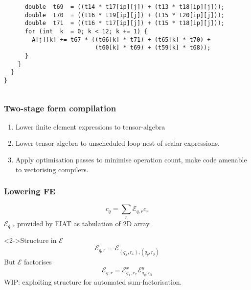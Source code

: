 \documentclass[presentation]{beamer}
\begin{document}
\begin{frame}[fragile]
\begin{onlyenv}
{\begin{columns}
\begin{column}{0.5\textwidth}
\begin{verbatim}
      double  t69  = ((t14 * t17[ip][j]) + (t13 * t18[ip][j]));
      double  t70  = ((t16 * t19[ip][j]) + (t15 * t20[ip][j]));
      double  t71  = ((t16 * t17[ip][j]) + (t15 * t18[ip][j]));
      for (int  k  = 0; k < 12; k += 1) {
        A[j][k] += t67 * ((t66[k] * t71) + (t65[k] * t70) +
                          (t60[k] * t69) + (t59[k] * t68));
      }
    }
  }
}
\end{verbatim}
\end{column}
\end{columns}
}
  \end{onlyenv}
\end{frame}

\begin{frame}
  \frametitle{Two-stage form compilation}
  \begin{enumerate}[<+->]
  \item Lower finite element expressions to tensor-algebra
  \item Lower tensor algebra to unscheduled loop nest of scalar
    expressions.
  \item Apply optimisation passes to minimise operation count, make
    code amenable to vectorising compilers.
  \end{enumerate}

\end{frame}
\begin{frame}
  \frametitle{Lowering FE}
  \begin{equation*}
    c_q = \sum_r \mathcal{E}_{q, r} c_r
  \end{equation*}
  $\mathcal{E}_{q, r}$ provided by FIAT as tabulation of 2D array.
  \begin{block}<2->{Structure in $\mathcal{E}$}
    \begin{equation*}
      \mathcal{E}_{q,r} = \mathcal{E}_{(q_x,r_x),(q_y, r_y)}
    \end{equation*}
    But $\mathcal{E}$ factorises
    \begin{equation*}
      \mathcal{E}_{q, r} = \mathcal{E}^x_{q_x, r_x}
      \mathcal{E}^y_{q_y, r_y}
    \end{equation*}
    WIP: exploiting structure for automated sum-factorisation.
  \end{block}
\end{frame}
\end{document}
